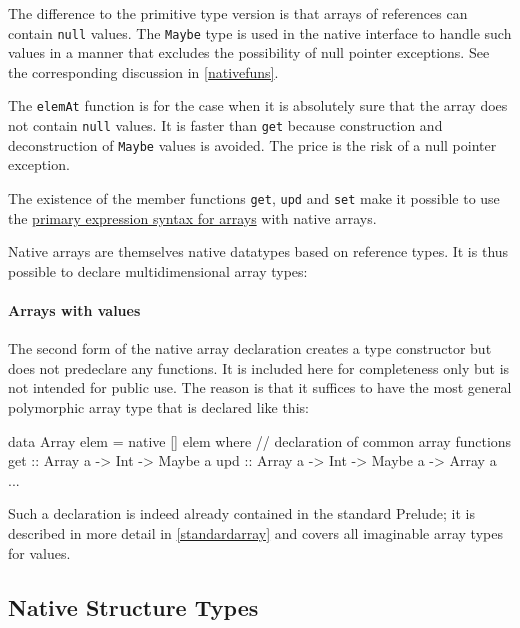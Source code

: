 The difference to the primitive type version is that \java{} arrays of references can contain \texttt{null} values. The \texttt{Maybe} type is used in the native interface to handle such values in a manner that excludes the possibility of null pointer exceptions. See the corresponding discussion in \autoref{nativefuns}.

The \texttt{elemAt} function is for the case when it is absolutely sure that the array does not contain \texttt{null} values. It is faster than \texttt{get} because construction and deconstruction of \texttt{Maybe} values is avoided. The price is the risk of a null pointer exception.

The existence of the member functions \texttt{get}, \texttt{upd} and \texttt{set} make it possible to use the \hyperref[arrayop]{primary expression syntax for arrays} with native arrays.

Native arrays are themselves native datatypes based on reference types. It is thus possible to declare multidimensional array types: 

\paragraph*{Arrays with \frege{} values} The second form of the native array declaration creates a type constructor but does not predeclare any functions. It is included here for completeness only but is not intended for public use. The reason is that it suffices to have the most general polymorphic array type that is declared like this:
\begin{code}
data Array elem = native [] elem where
    // declaration of common array functions
    get :: Array a -> Int -> Maybe a
    upd :: Array a -> Int -> Maybe a -> Array a
    ...
\end{code}
Such a declaration is indeed already contained in the standard Prelude; it is described in more detail in \autoref{standardarray} and covers all imaginable array types for \frege{} values.

\subsection{Native Structure Types}

